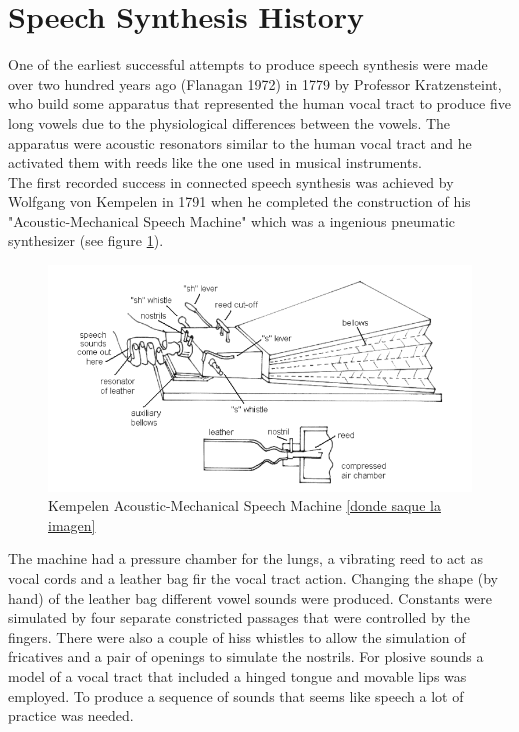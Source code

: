 \section{Speech Synthesis History}\label{ssh}
One of the earliest successful attempts to produce speech synthesis were made over two hundred years ago (Flanagan 1972) in 1779 by Professor Kratzensteint, who build some apparatus that represented the human vocal tract to produce five long vowels due to the physiological differences between the vowels. The apparatus were acoustic resonators similar to the human vocal tract and he activated them with reeds like the one used in musical instruments.\\
The first recorded success in connected speech synthesis was achieved by  Wolfgang von Kempelen in 1791 when he completed the construction of his "Acoustic-Mechanical Speech Machine" which was a ingenious pneumatic synthesizer (see figure \ref{kempelen}).
\begin{figure}[!htb]
	\begin{center}
	\includegraphics[width=1\textwidth]{img/kempelen.png}
	\end{center}
	\caption{\label{kempelen}Kempelen Acoustic-Mechanical Speech Machine \ref{donde saque la imagen}}
\end{figure}
The machine had a pressure chamber for the lungs, a vibrating reed to act as vocal cords and a leather bag fir the vocal tract action. Changing the shape (by hand) of the leather bag different vowel sounds were produced. Constants were simulated by four separate constricted passages that were controlled by the fingers. There were also a couple of hiss whistles to allow the simulation of fricatives and a pair of openings to simulate the nostrils. For plosive sounds a model of a vocal tract that included a hinged tongue and movable lips was employed. To produce a sequence of sounds that seems like speech a lot of practice was needed.\\

